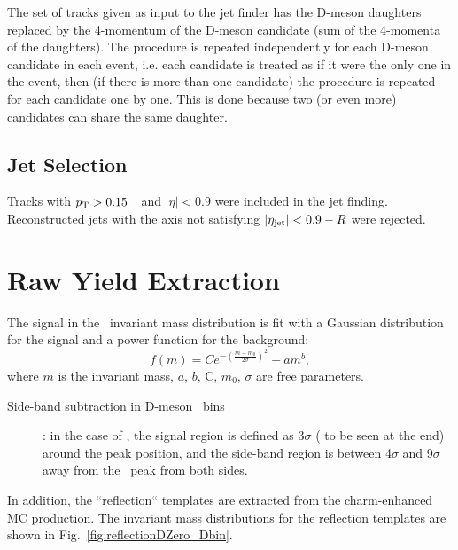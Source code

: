 The set of tracks given as input to the jet finder has the D-meson daughters replaced 
by the 4-momentum of the D-meson candidate (sum of the 4-momenta of the daughters).
The procedure is repeated independently for each D-meson candidate in each event, 
i.e. each candidate is treated as if it were the only one in the event, then (if there is more than one candidate) the procedure
is repeated for each candidate one by one.
This is done because two (or even more) candidates can share the same daughter. 

\subsection{Jet Selection}

Tracks with $p_{\rm T}>0.15$~\GeVc\ and $|\eta|<0.9$ were included in the jet finding. 
Reconstructed jets with the axis not satisfying $|\eta_{\mathrm{jet}}|<0.9-R$ were rejected.


\section{Raw Yield Extraction}
\label{sect:raw_yield}

The signal in the \Dzero\ invariant mass distribution is fit with a Gaussian distribution for the signal and a power function for the background:
\begin{equation}
\label{e_sigbkgDZero}
f (m) = Ce^{-(\frac{m-m_0}{2\sigma})^2} + am^b,
\end{equation}
where $m$ is the invariant mass, $a$, $b$, C, $m_0$, $\sigma$ are free parameters.

\begin{description}
\item[Side-band subtraction in D-meson \pt\ bins]: in the case of \Dzero, the signal region is defined as $3\sigma$ ({\color{red} to be seen at the end}) around the peak position, and the side-band region is between 4$\sigma$ and 9$\sigma$ away from the \Dzero\ peak from both sides.
\end{description}

In addition, the ``reflection`` templates are extracted from the charm-enhanced MC production. The invariant mass distributions for the reflection templates are shown in Fig.~\ref{fig:reflectionDZero_Dbin}.

